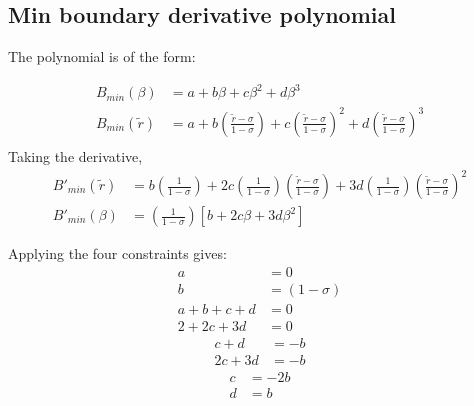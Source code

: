 \documentclass[a4paper]{article}
\begin{document}









\subsection{Min boundary derivative polynomial}

The polynomial is of the form: 

\begin{align*}
    B_{min} \left( \beta \right) &= 
    a + b \beta + c \beta^2 + d \beta^3                   \\
    B_{min} \left( \widetilde{r} \right) &= 
    a + b \left( \frac{\widetilde{r} - \sigma}{1 - \sigma} \right)+
    c\left( \frac{\widetilde{r} - \sigma}{1 - \sigma} \right)  ^2+
    d\left( \frac{\widetilde{r} - \sigma}{1 - \sigma} \right)^3                    \\
\end{align*}
Taking the derivative,
\begin{align*}
    B'_{min} \left( \widetilde{r} \right) &= 
    b \left( \frac{1}{1 - \sigma} \right)+
    2 c\left( \frac{1}{1 - \sigma} \right)\left( \frac{\widetilde{r} - \sigma}{1 - \sigma} \right)  +
    3 d\left( \frac{1}{1-\sigma} \right)\left( \frac{\widetilde{r} - \sigma}{1 - \sigma} \right)^2\\
    B'_{min} \left( \beta \right) &= 
    \left( \frac{1}{1 - \sigma} \right)
    \left[
    b +
    2 c \beta + 
    3 d \beta^2
    \right]
\end{align*}


Applying the four constraints gives:
\begin{align*}
    a &= 0\\
    b &= \left( 1 - \sigma \right) \\
    a + b + c + d &= 0\\
    2 + 2c + 3d &= 0
\end{align*}
\begin{align*}
    c + d &= -b  \\
    2c + 3d &= -b
\end{align*}
\begin{align*}
    c &= -2b \\
    d &= b
\end{align*}
\end{document}
